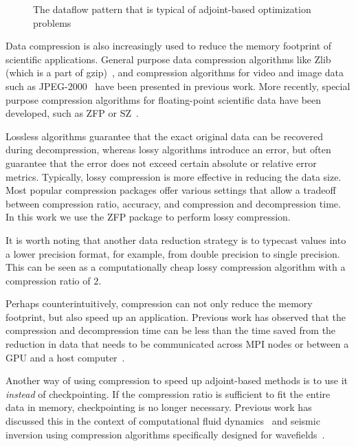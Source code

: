 \documentclass[conference]{IEEEtran}
\begin{document}
\begin{figure}
\begin{center}

\end{center}
\caption{The dataflow pattern that is typical of adjoint-based optimization problems}
\label{fig:dataflow}
\end{figure}


Data compression is also increasingly used to reduce the memory footprint of
scientific applications. General purpose data compression algorithms like Zlib
(which is a part of gzip)~\cite{deutsch1996zlib}, and compression algorithms for
video and image data such as JPEG-2000~\cite{skodras2001jpeg} have been
presented in previous work. More recently, special purpose compression
algorithms for floating-point scientific data have been developed, such as ZFP
or SZ~\cite{Kaklamanis:2012aa,lindstrom2014fixed,di2018efficient}.

Lossless algorithms guarantee that the exact original data can be recovered
during decompression, whereas lossy algorithms introduce an error, but often
guarantee that the error does not exceed certain absolute or relative error
metrics. Typically, lossy compression is more effective in reducing the data
size. Most popular compression packages offer various settings that allow a
tradeoff between compression ratio, accuracy, and compression and decompression
time. In this work we use the ZFP package to perform lossy compression.

It is worth noting that another data reduction strategy is to typecast values
into a lower precision format, for example, from double precision to single
precision. This can be seen as a computationally cheap lossy compression
algorithm with a compression ratio of $2$.

Perhaps counterintuitively, compression can not only reduce the memory
footprint, but also speed up an application. Previous work has observed that the
compression and decompression time can be less than the time saved from the
reduction in data that needs to be communicated across MPI nodes or between a
GPU and a host computer~\cite{gpu-compression}.

Another way of using compression to speed up adjoint-based methods is to use it \emph{instead} of
checkpointing. If the compression ratio is sufficient to fit the
entire data in memory, checkpointing is no longer necessary. Previous
work has discussed this in the context of computational
fluid dynamics~\cite{cyr2015towards} and seismic inversion using
compression algorithms specifically designed for
wavefields~\cite{dalmau2014lossy,boehm2016wavefield}.
\end{document}
